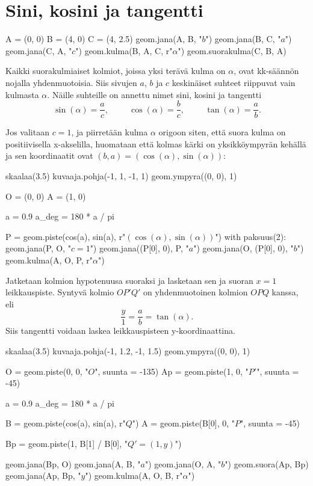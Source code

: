 \section{Sini, kosini ja tangentti}
\begin{kuva}
A = (0, 0)
B = (4, 0)
C = (4, 2.5)
geom.jana(A, B, "$b$")
geom.jana(B, C, "$a$")
geom.jana(C, A, "$c$")
geom.kulma(B, A, C, r"$\alpha$")
geom.suorakulma(C, B, A)
\end{kuva}

Kaikki suorakulmiaiset kolmiot, joissa yksi terävä kulma on $\alpha$, ovat kk-säännön nojalla yhdenmuotoisia. Siis sivujen $a$, $b$ ja $c$ keskinäiset suhteet riippuvat vain kulmasta $\alpha$. Näille suhteille on annettu nimet sini, kosini ja tangentti
\[\sin(\alpha) = \frac{a}{c},\hspace{1cm}\cos(\alpha) = \frac{b}{c}, \hspace{1cm}\tan(\alpha) = \frac{a}{b}.\]

Jos valitaan $c = 1$, ja piirretään kulma $\alpha$ origoon siten, että suora kulma on positiivisella x-akselilla, huomataan että kolmas kärki on yksikköympyrän kehällä ja sen koordinaatit ovat $(b, a) = (\cos(\alpha), \sin(\alpha))$:

\begin{kuva}
skaalaa(3.5)
kuvaaja.pohja(-1, 1, -1, 1)
geom.ympyra((0, 0), 1)

O = (0, 0)
A = (1, 0)

a = 0.9
a_deg = 180 * a / pi

P = geom.piste(cos(a), sin(a), r"$(\cos(\alpha), \sin(\alpha))$")
with paksuus(2):
	geom.jana(P, O, "$c = 1$")
	geom.jana((P[0], 0), P, "$a$")
	geom.jana(O, (P[0], 0), "$b$")
geom.kulma(A, O, P, r"$\alpha$")
\end{kuva}

Jatketaan kolmion hypotenuusa suoraksi ja lasketaan sen ja suoran $x = 1$ leikkauspiste. Syntyvä kolmio $OP'Q'$ on yhdenmuotoinen kolmion $OPQ$ kanssa, eli
\[\frac{y}{1} = \frac{a}{b} = \tan(\alpha).\]
Siis tangentti voidaan laskea leikkauspisteen y-koordinaattina.

\begin{kuva}
skaalaa(3.5)
kuvaaja.pohja(-1, 1.2, -1, 1.5)
geom.ympyra((0, 0), 1)

O = geom.piste(0, 0, "$O$", suunta = -135)
Ap = geom.piste(1, 0, "$P'$", suunta = -45)

a = 0.9
a_deg = 180 * a / pi

B = geom.piste(cos(a), sin(a), r"$Q$")
A = geom.piste(B[0], 0, "$P$", suunta = -45)

Bp = geom.piste(1, B[1] / B[0], "$Q' = (1, y)$")

geom.jana(Bp, O)
geom.jana(A, B, "$a$")
geom.jana(O, A, "$b$")
geom.suora(Ap, Bp)
geom.jana(Ap, Bp, "$y$")
geom.kulma(A, O, B, r"$\alpha$")
\end{kuva}

